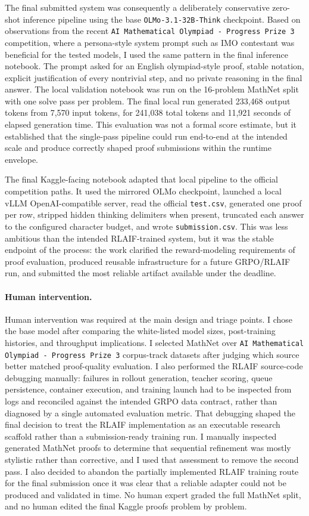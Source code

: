 The final submitted system was consequently a deliberately conservative zero-shot inference pipeline using the base \texttt{OLMo-3.1-32B-Think} checkpoint. Based on observations from the recent \texttt{AI Mathematical Olympiad - Progress Prize 3} competition, where a persona-style system prompt such as IMO contestant was beneficial for the tested models, I used the same pattern in the final inference notebook. The prompt asked for an English olympiad-style proof, stable notation, explicit justification of every nontrivial step, and no private reasoning in the final answer. The local validation notebook was run on the 16-problem MathNet split with one solve pass per problem. The final local run generated 233,468 output tokens from 7,570 input tokens, for 241,038 total tokens and 11,921 seconds of elapsed generation time. This evaluation was not a formal score estimate, but it established that the single-pass pipeline could run end-to-end at the intended scale and produce correctly shaped proof submissions within the runtime envelope.

The final Kaggle-facing notebook adapted that local pipeline to the official competition paths. It used the mirrored OLMo checkpoint, launched a local vLLM OpenAI-compatible server, read the official \texttt{test.csv}, generated one proof per row, stripped hidden thinking delimiters when present, truncated each answer to the configured character budget, and wrote \texttt{submission.csv}. This was less ambitious than the intended RLAIF-trained system, but it was the stable endpoint of the process: the work clarified the reward-modeling requirements of proof evaluation, produced reusable infrastructure for a future GRPO/RLAIF run, and submitted the most reliable artifact available under the deadline.

\paragraph{Human intervention.} Human intervention was required at the main design and triage points. I chose the base model after comparing the white-listed model sizes, post-training histories, and throughput implications. I selected MathNet over \texttt{AI Mathematical Olympiad - Progress Prize 3} corpus-track datasets after judging which source better matched proof-quality evaluation. I also performed the RLAIF source-code debugging manually: failures in rollout generation, teacher scoring, queue persistence, container execution, and training launch had to be inspected from logs and reconciled against the intended GRPO data contract, rather than diagnosed by a single automated evaluation metric. That debugging shaped the final decision to treat the RLAIF implementation as an executable research scaffold rather than a submission-ready training run. I manually inspected generated MathNet proofs to determine that sequential refinement was mostly stylistic rather than corrective, and I used that assessment to remove the second pass. I also decided to abandon the partially implemented RLAIF training route for the final submission once it was clear that a reliable adapter could not be produced and validated in time. No human expert graded the full MathNet split, and no human edited the final Kaggle proofs problem by problem.

\endgroup
